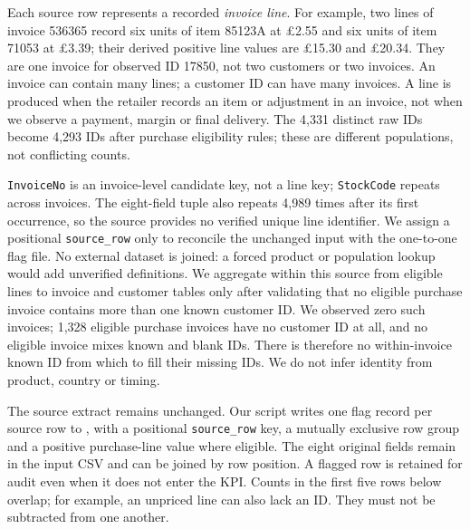 \documentclass[10pt,a4paper]{article}
\newcommand{\sectionhead}[1]{\Needspace{8\baselineskip}\vspace{0.33em}{\large\bfseries\color{navy}#1}\par\vspace{0.08em}}
\begin{document}
Each source row represents a recorded \emph{invoice line}. For example, two lines of invoice 536365 record six units of item 85123A at \pounds2.55 and six units of item 71053 at \pounds3.39; their derived positive line values are \pounds15.30 and \pounds20.34. They are one invoice for observed ID 17850, not two customers or two invoices. An invoice can contain many lines; a customer ID can have many invoices. A line is produced when the retailer records an item or adjustment in an invoice, not when we observe a payment, margin or final delivery. The 4,331 distinct raw IDs become 4,293 IDs after purchase eligibility rules; these are different populations, not conflicting counts.

\texttt{InvoiceNo} is an invoice-level candidate key, not a line key; \texttt{StockCode} repeats across invoices. The eight-field tuple also repeats 4,989 times after its first occurrence, so the source provides no verified unique line identifier. We assign a positional \texttt{source\_row} only to reconcile the unchanged input with the one-to-one flag file. No external dataset is joined: a forced product or population lookup would add unverified definitions. We aggregate within this source from eligible lines to invoice and customer tables only after validating that no eligible purchase invoice contains more than one known customer ID. We observed zero such invoices; 1,328 eligible purchase invoices have no customer ID at all, and no eligible invoice mixes known and blank IDs. There is therefore no within-invoice known ID from which to fill their missing IDs. We do not infer identity from product, country or timing.

\sectionhead{4\quad Preparation: flags, treatments and validation}
The source extract remains unchanged. Our script writes one flag record per source row to , with a positional \texttt{source\_row} key, a mutually exclusive row group and a positive purchase-line value where eligible. The eight original fields remain in the input CSV and can be joined by row position. A flagged row is retained for audit even when it does not enter the KPI. Counts in the first five rows below overlap; for example, an unpriced line can also lack an ID. They must not be subtracted from one another.
\end{document}

